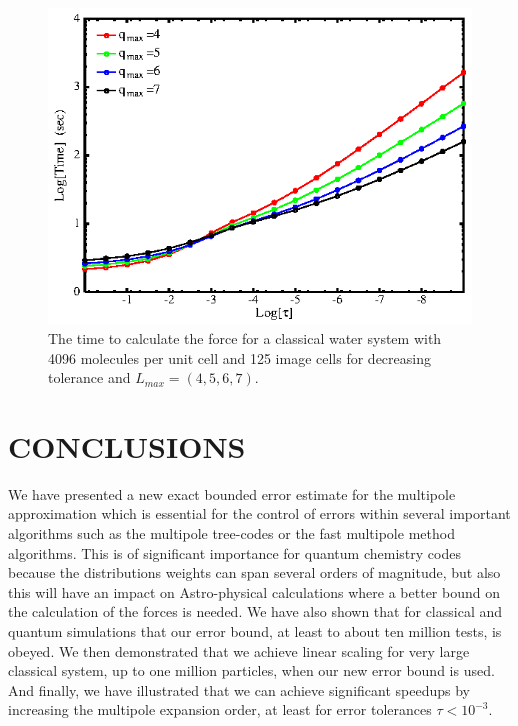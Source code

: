 \documentclass[prb,aps,nobibnotes,twocolumn,doublespace,twocolumngrid,superbib]{revtex4}
\begin{document}
%
%
\begin{figure}
\caption{The time to calculate the force for a classical water system with 4096 molecules
per unit cell and 125 image cells for  decreasing tolerance and  $L_{max}=(4,5,6,7)$.}
{\centering \includegraphics {Time_vs_Tau_W4096.ps} \par} 
\label{figure:TimeVsTauWater4096} 
\end{figure}

\section{CONCLUSIONS}

We have presented a new exact bounded error estimate for the multipole approximation which 
is essential for the control of errors within several important algorithms such as the multipole tree-codes 
or the fast multipole method algorithms.
%
This is of significant importance for quantum chemistry codes because the distributions 
weights can span several orders of magnitude, but also this will have an impact on Astro-physical calculations
where a better bound on the calculation of the forces is needed. 
%
We have also shown that for classical and quantum simulations that our error bound, at least to 
about ten million tests, is obeyed. 
%
We then demonstrated that we achieve linear scaling for very large classical system, up to one million particles, 
when our new error bound is used. 
%
And finally, we have illustrated that we can achieve significant speedups
by increasing the multipole expansion order, at least for error tolerances 
$\tau < 10^{-3}$.
\end{document}
